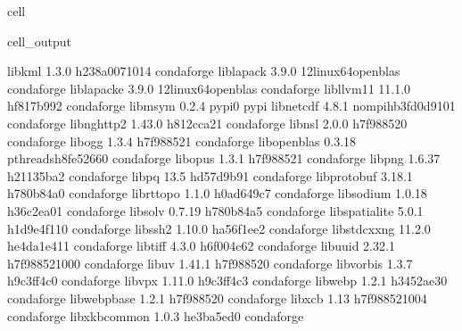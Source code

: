 \documentclass[letterpaper,table,10pt,english]{jupyterBook}
\begin{document}
\begin{sphinxuseclass}{cell}
\begin{sphinxVerbatimOutput}
\begin{sphinxuseclass}{cell_output}
\begin{sphinxVerbatim}[commandchars=\\\{\}]
libkml                    1.3.0             h238a007\PYGZus{}1014    conda\PYGZhy{}forge
liblapack                 3.9.0           12\PYGZus{}linux64\PYGZus{}openblas    conda\PYGZhy{}forge
liblapacke                3.9.0           12\PYGZus{}linux64\PYGZus{}openblas    conda\PYGZhy{}forge
libllvm11                 11.1.0               hf817b99\PYGZus{}2    conda\PYGZhy{}forge
libmsym                   0.2.4                    pypi\PYGZus{}0    pypi
libnetcdf                 4.8.1           nompi\PYGZus{}hb3fd0d9\PYGZus{}101    conda\PYGZhy{}forge
libnghttp2                1.43.0               h812cca2\PYGZus{}1    conda\PYGZhy{}forge
libnsl                    2.0.0                h7f98852\PYGZus{}0    conda\PYGZhy{}forge
libogg                    1.3.4                h7f98852\PYGZus{}1    conda\PYGZhy{}forge
libopenblas               0.3.18          pthreads\PYGZus{}h8fe5266\PYGZus{}0    conda\PYGZhy{}forge
libopus                   1.3.1                h7f98852\PYGZus{}1    conda\PYGZhy{}forge
libpng                    1.6.37               h21135ba\PYGZus{}2    conda\PYGZhy{}forge
libpq                     13.5                 hd57d9b9\PYGZus{}1    conda\PYGZhy{}forge
libprotobuf               3.18.1               h780b84a\PYGZus{}0    conda\PYGZhy{}forge
librttopo                 1.1.0                h0ad649c\PYGZus{}7    conda\PYGZhy{}forge
libsodium                 1.0.18               h36c2ea0\PYGZus{}1    conda\PYGZhy{}forge
libsolv                   0.7.19               h780b84a\PYGZus{}5    conda\PYGZhy{}forge
libspatialite             5.0.1               h1d9e4f1\PYGZus{}10    conda\PYGZhy{}forge
libssh2                   1.10.0               ha56f1ee\PYGZus{}2    conda\PYGZhy{}forge
libstdcxx\PYGZhy{}ng              11.2.0              he4da1e4\PYGZus{}11    conda\PYGZhy{}forge
libtiff                   4.3.0                h6f004c6\PYGZus{}2    conda\PYGZhy{}forge
libuuid                   2.32.1            h7f98852\PYGZus{}1000    conda\PYGZhy{}forge
libuv                     1.41.1               h7f98852\PYGZus{}0    conda\PYGZhy{}forge
libvorbis                 1.3.7                h9c3ff4c\PYGZus{}0    conda\PYGZhy{}forge
libvpx                    1.11.0               h9c3ff4c\PYGZus{}3    conda\PYGZhy{}forge
libwebp                   1.2.1                h3452ae3\PYGZus{}0    conda\PYGZhy{}forge
libwebp\PYGZhy{}base              1.2.1                h7f98852\PYGZus{}0    conda\PYGZhy{}forge
libxcb                    1.13              h7f98852\PYGZus{}1004    conda\PYGZhy{}forge
libxkbcommon              1.0.3                he3ba5ed\PYGZus{}0    conda\PYGZhy{}forge

\end{sphinxVerbatim}
\end{sphinxuseclass}
\end{sphinxVerbatimOutput}
\end{sphinxuseclass}
\end{document}
